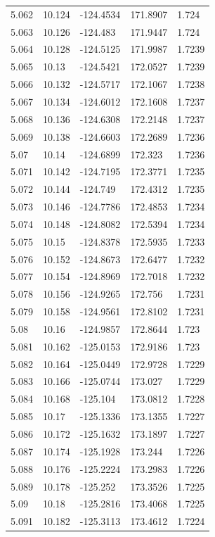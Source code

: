\begin{tabular}{lllll}
5.062 & 10.124 & -124.4534 & 171.8907 & 1.724 \\
5.063 & 10.126 & -124.483 & 171.9447 & 1.724 \\
5.064 & 10.128 & -124.5125 & 171.9987 & 1.7239 \\
5.065 & 10.13 & -124.5421 & 172.0527 & 1.7239 \\
5.066 & 10.132 & -124.5717 & 172.1067 & 1.7238 \\
5.067 & 10.134 & -124.6012 & 172.1608 & 1.7237 \\
5.068 & 10.136 & -124.6308 & 172.2148 & 1.7237 \\
5.069 & 10.138 & -124.6603 & 172.2689 & 1.7236 \\
5.07 & 10.14 & -124.6899 & 172.323 & 1.7236 \\
5.071 & 10.142 & -124.7195 & 172.3771 & 1.7235 \\
5.072 & 10.144 & -124.749 & 172.4312 & 1.7235 \\
5.073 & 10.146 & -124.7786 & 172.4853 & 1.7234 \\
5.074 & 10.148 & -124.8082 & 172.5394 & 1.7234 \\
5.075 & 10.15 & -124.8378 & 172.5935 & 1.7233 \\
5.076 & 10.152 & -124.8673 & 172.6477 & 1.7232 \\
5.077 & 10.154 & -124.8969 & 172.7018 & 1.7232 \\
5.078 & 10.156 & -124.9265 & 172.756 & 1.7231 \\
5.079 & 10.158 & -124.9561 & 172.8102 & 1.7231 \\
5.08 & 10.16 & -124.9857 & 172.8644 & 1.723 \\
5.081 & 10.162 & -125.0153 & 172.9186 & 1.723 \\
5.082 & 10.164 & -125.0449 & 172.9728 & 1.7229 \\
5.083 & 10.166 & -125.0744 & 173.027 & 1.7229 \\
5.084 & 10.168 & -125.104 & 173.0812 & 1.7228 \\
5.085 & 10.17 & -125.1336 & 173.1355 & 1.7227 \\
5.086 & 10.172 & -125.1632 & 173.1897 & 1.7227 \\
5.087 & 10.174 & -125.1928 & 173.244 & 1.7226 \\
5.088 & 10.176 & -125.2224 & 173.2983 & 1.7226 \\
5.089 & 10.178 & -125.252 & 173.3526 & 1.7225 \\
5.09 & 10.18 & -125.2816 & 173.4068 & 1.7225 \\
5.091 & 10.182 & -125.3113 & 173.4612 & 1.7224 \\

\end{tabular}
